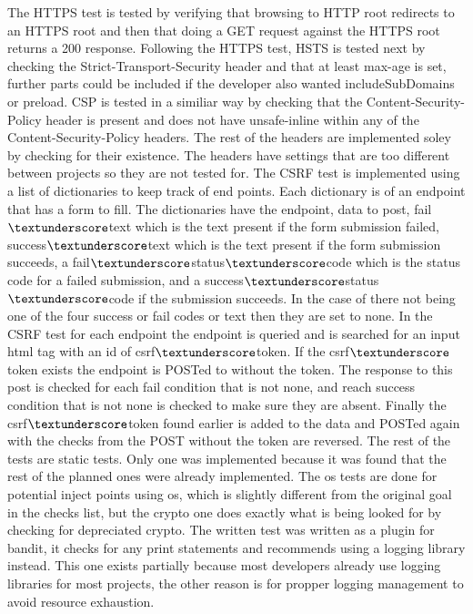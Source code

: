 The HTTPS test is tested by verifying that browsing to HTTP root redirects to an HTTPS root and then that doing a GET request against the HTTPS root returns a 200 response. Following the HTTPS test,
HSTS is tested next by checking the Strict-Transport-Security header and that at least max-age is set, further parts could be included if the developer also wanted includeSubDomains or preload. CSP
is tested in a similiar way by checking that the Content-Security-Policy header is present and does not have unsafe-inline within any of the Content-Security-Policy headers. The rest of the headers
are implemented soley by checking for their existence. The headers have settings that are too different between projects so they are not tested for. The CSRF test is implemented using a list of
dictionaries to keep track of end points. Each dictionary is of an endpoint that has a form to fill. The dictionaries have the endpoint, data to post, fail$\textunderscore$text which is the text present if the form
submission failed, success$\textunderscore$text which is the text present if the form submission succeeds, a fail$\textunderscore$status$\textunderscore$code which is the status code for a failed submission, and a success$\textunderscore$status$\textunderscore$code if
the submission succeeds. In the case of there not being one of the four success or fail codes or text then they are set to none. In the CSRF test for each endpoint the endpoint is queried and
is searched for an input html tag with an id of csrf$\textunderscore$token. If the csrf$\textunderscore$token exists the endpoint is POSTed to without the token. The response to this post is checked for each fail condition that is
not none, and reach success condition that is not none is checked to make sure they are absent. Finally the csrf$\textunderscore$token found earlier is added to the data and POSTed again with the checks from
the POST without the token are reversed. The rest of the tests are static tests. Only one was implemented because it was found that the rest of the planned ones were already implemented. The os tests
are done for potential inject points using os, which is slightly different from the original goal in the checks list, but the crypto one does exactly what is being looked for by checking for
depreciated crypto. The written test was written as a plugin for bandit, it checks for any print statements and recommends using a logging library instead. This one exists partially because most
developers already use logging libraries for most projects, the other reason is for propper logging management to avoid resource exhaustion. 

